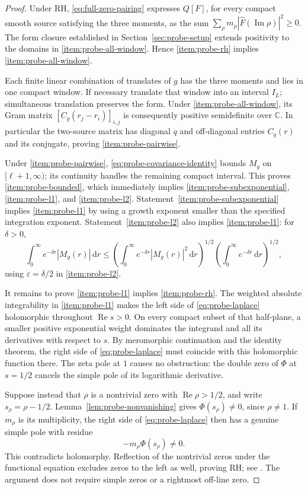 \documentclass[11pt]{article}
\numberwithin{equation}{section}
\theoremstyle{definition}
\theoremstyle{remark}
\newcommand{\Rea}{\operatorname{Re}}
\newcommand{\Ima}{\operatorname{Im}}
\newcommand{\dd}{\,\mathrm d}
\begin{document}
\begin{proof}
Under RH, \eqref{eq:full-zero-pairing} expresses \(Q[F]\), for every
compact smooth source satisfying the three moments, as the sum
\(\sum_\rho m_\rho|\widehat F(\Ima\rho)|^2\ge0\).
The form closure established in Section~\ref{sec:probe-setup}
extends positivity to the domains in
\ref{item:probe-all-window}. Hence
\ref{item:probe-rh} implies \ref{item:probe-all-window}.

Each finite linear combination of translates of \(g\) has the three
moments and lies in one compact window. If necessary translate that
window into an interval \(I_L\); simultaneous translation preserves
the form. Under \ref{item:probe-all-window}, its Gram matrix
\([C_g(r_j-r_i)]_{i,j}\) is consequently positive semidefinite over
\(\mathbb C\). In particular the two-source matrix has diagonal
\(q\) and off-diagonal entries \(C_g(r)\) and its conjugate, proving
\ref{item:probe-pairwise}.

Under \ref{item:probe-pairwise},
\eqref{eq:probe-covariance-identity} bounds \(M_g\) on
\([\ell+1,\infty)\); its continuity handles the remaining compact
interval. This proves \ref{item:probe-bounded}, which immediately
implies \ref{item:probe-subexponential}, \ref{item:probe-l1}, and
\ref{item:probe-l2}. Statement~\ref{item:probe-subexponential}
implies \ref{item:probe-l1} by using a growth exponent smaller than
the specified integration exponent. Statement~\ref{item:probe-l2}
also implies \ref{item:probe-l1}: for \(\delta>0\),
\[
\int_0^\infty e^{-\delta r}|M_g(r)|\dd r
\le
\left(\int_0^\infty e^{-\delta r}|M_g(r)|^2\dd r\right)^{1/2}
\left(\int_0^\infty e^{-\delta r}\dd r\right)^{1/2},
\]
using \(\varepsilon=\delta/2\) in \ref{item:probe-l2}.

It remains to prove \ref{item:probe-l1} implies \ref{item:probe-rh}.
The weighted absolute integrability in \ref{item:probe-l1} makes
the left side of \eqref{eq:probe-laplace} holomorphic throughout
\(\Rea s>0\). On every compact subset of that half-plane, a smaller
positive exponential weight dominates the integrand and all its
derivatives with respect to \(s\). By meromorphic continuation and
the identity theorem, the right side of \eqref{eq:probe-laplace}
must coincide with this holomorphic function there. The zeta pole
at \(1\) causes no obstruction: the double zero of \(\Phi\) at
\(s=1/2\) cancels the simple pole of its logarithmic derivative.

Suppose instead that \(\rho\) is a nontrivial zero with
\(\Rea\rho>1/2\), and write \(s_\rho=\rho-1/2\).
Lemma~\ref{lem:probe-nonvanishing} gives \(\Phi(s_\rho)\ne0\),
since \(\rho\ne1\). If \(m_\rho\) is its multiplicity, the right
side of \eqref{eq:probe-laplace} then has a genuine simple pole with
residue
\begin{equation}\label{eq:probe-residue}
-m_\rho\Phi(s_\rho)\ne0.
\end{equation}
This contradicts holomorphy. Reflection of the nontrivial zeros under
the functional equation excludes zeros to the left as well, proving
RH; see \cite[\S\S25.4, 25.10]{DLMF}. The argument does not require
simple zeros or a rightmost off-line zero.
\end{proof}
\end{document}

